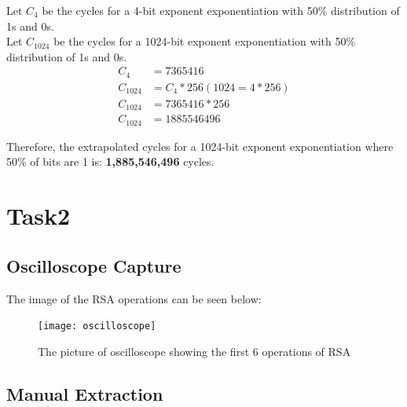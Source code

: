 \documentclass[1p,16pt]{elsarticle}
\begin{document}
Let $C_{4}$ be the cycles for a 4-bit exponent exponentiation with 50\% distribution of 1s and 0s.\\
Let $C_{1024}$ be the cycles for a 1024-bit exponent exponentiation with 50\% distribution of 1s and 0s.\\
\begin{align}
	C_4 &= 7365416 \\
	C_{1024} &=  C_4 * 256 (1024 = 4 * 256) \\
	C_{1024} &= 7365416 * 256 \\
	C_{1024} &= 1885546496
\end{align}

Therefore, the extrapolated cycles for a 1024-bit exponent exponentiation where 50\% of bits are 1 is:
\textbf{1,885,546,496} cycles.
\section{Task2}

\subsection{Oscilloscope Capture}%
\label{sub:oscilloscope_capture}
The image of the RSA operations can be seen below:
\begin{figure}[H]
	\centering
    \centerline{\texttt{[image: oscilloscope]}}
    \caption{The picture of oscilloscope showing the first 6 operations of RSA}\label{fig:oscilloscope}
\end{figure}

\subsection{Manual Extraction}%
\label{sub:manual_extraction}
\end{document}

